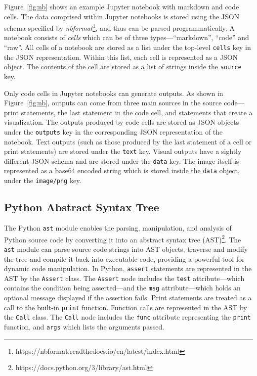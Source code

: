 \documentclass[smallextended]{svjour3}       %
\begin{document}
Figure~\ref{fig:nb} shows an example Jupyter notebook with markdown and code cells. The data comprised within Jupyter notebooks is stored using the JSON schema specified by \emph{nbformat}\footnote{https://nbformat.readthedocs.io/en/latest/index.html}, and thus can be parsed programmatically. A notebook consists of \emph{cells} which can be of three types---``markdown'', ``code'' and ``raw''. All cells of a notebook are stored as a list under the top-level \lstinline[language={}]$cells$ key in the JSON representation. Within this list, each cell is represented as a JSON object. The contents of the cell are stored as a list of strings inside the \lstinline[language={}]$source$ key.

Only code cells in Jupyter notebooks can generate outputs. As shown in Figure~\ref{fig:nb}, outputs can come from three main sources in the source code---print statements, the last statement in the code cell, and statements that create a visualization. The outputs produced by code cells are stored as JSON objects under the \lstinline[language={}]$outputs$ key in the corresponding JSON representation of the notebook. Text outputs (such as those produced by the last statement of a cell or print statements) are stored under the \lstinline[language={}]$text$ key. Visual outputs have a sightly different JSON schema and are stored under the \lstinline[language={}]$data$ key. The image itself is represented as a base64 encoded string which is stored inside the \lstinline[language={}]$data$ object, under the \lstinline[language={}]$image/png$ key.

\subsection{Python Abstract Syntax Tree}

The Python \lstinline{ast} module enables the parsing, manipulation, and analysis of Python source code by converting it into an abstract syntax tree (AST)\footnote{https://docs.python.org/3/library/ast.html}. The \lstinline{ast} module can parse source code strings into AST objects, traverse and modify the tree and compile it back into executable code, providing a powerful tool for dynamic code manipulation. In Python, \lstinline{assert} statements are represented in the AST by the \lstinline{Assert} class. The \lstinline{Assert} node includes the \lstinline{test} attribute---which contains the condition being asserted---and the \lstinline{msg} attribute---which holds an optional message displayed if the assertion fails. Print statements are treated as a call to the built-in \lstinline{print} function. Function calls are represented in the AST by the \lstinline{Call} class. The \lstinline{Call} node includes the \lstinline{func} attribute representing the \lstinline{print} function, and \lstinline{args} which lists the arguments passed.
\end{document}
